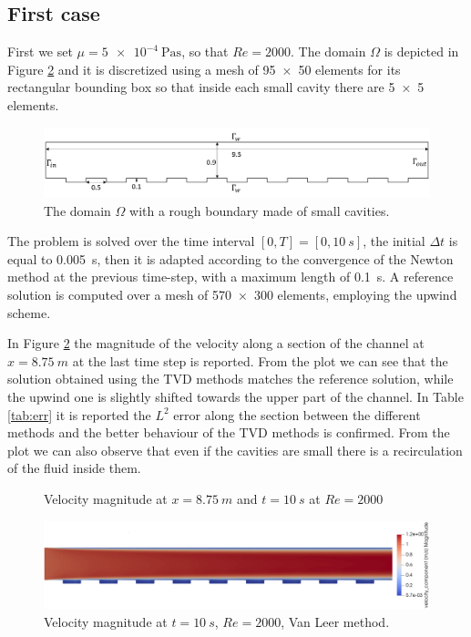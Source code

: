 \documentclass[11pt, a4paper]{article}
\theoremstyle{definition}
\begin{document}
\subsection{First case}
First we set $\mu = \SI{5e-4}{\pascal\second}$, so that $Re = 2000$. The domain 
$\Omega$ 
is depicted in Figure \ref{fig:line_comp} and it is discretized using a mesh 
of \num{95x50} elements for its rectangular bounding box so that inside each 
small cavity there are \num{5x5} elements.
\begin{figure}[h]
	\centering
	\includegraphics[width = \textwidth]{rough_domain.png}
	\caption{The domain $\Omega$ with a rough boundary made of small cavities.}
	\label{fig:rough_domain}
\end{figure}

The problem is solved over the time interval $[0, T] = [0, \SI{10}{s}]$, the 
initial 
$\Delta t$ is equal to \SI{0.005}{s}, then it is adapted according to the 
convergence 
of the Newton method at the previous time-step, with a maximum length of 
\SI{0.1}{s}.
A reference solution is computed over a mesh of \num{570x300} elements, 
employing the upwind scheme.

In Figure \ref{fig:line_comp} the magnitude of the velocity along a section of 
the channel at $x=\SI{8.75}{m}$ at the last time step is reported. From the 
plot we 
can see that the 
solution obtained using the TVD methods matches the reference solution, while 
the upwind one is slightly shifted towards the upper part of the channel. In 
Table \ref{tab:err} it is reported the $L^2$ error along the section between 
the different methods and the better behaviour of the TVD methods is confirmed.
From the plot we can also observe that even if the cavities are small there is 
a recirculation of the fluid inside them. 

\begin{figure}[h]
	\centering
	
	\caption{Velocity magnitude at $x=\SI{8.75}{m}$ and $t=\SI{10}{s}$ at $Re = 
	2000$}
	\label{fig:line_comp}
\end{figure}

\begin{figure}[h]
	\centering
	\includegraphics[width=\textwidth]{rough_channel_vl}
	\caption{Velocity magnitude at $t=\SI{10}{s}$, $Re=2000$, Van Leer method.}
	\label{fig:cha_vl}
\end{figure}
\end{document}
